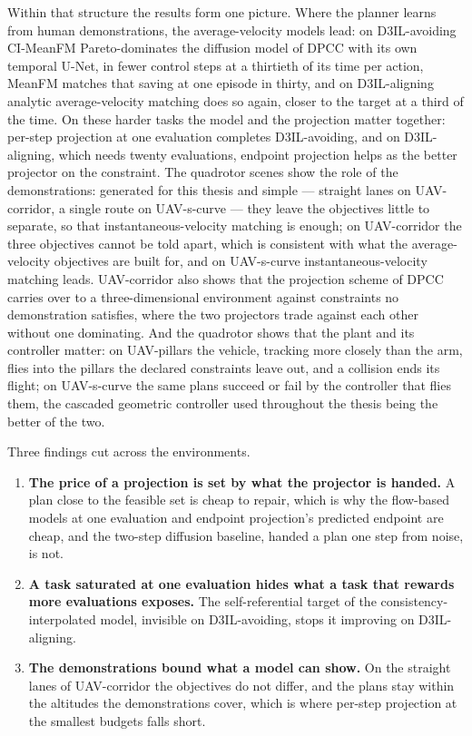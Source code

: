 Within that structure the results form one picture. Where the planner learns from human
demonstrations, the average-velocity models lead: on D3IL-avoiding CI-MeanFM Pareto-dominates the diffusion model of
\ac{DPCC} with its own temporal U-Net, in fewer control steps at a thirtieth of its time per action, MeanFM
matches that saving at one episode in thirty, and on
D3IL-aligning analytic average-velocity matching does so again, closer to the target at a third of the time.
On these harder tasks the model and the projection matter together: per-step projection at one evaluation
completes D3IL-avoiding, and on D3IL-aligning, which needs twenty evaluations, endpoint projection helps as the
better projector on the constraint. The quadrotor scenes show the role of the demonstrations: generated for
this thesis and simple --- straight lanes on UAV-corridor, a single route on UAV-s-curve --- they leave the
objectives little to separate, so that instantaneous-velocity matching is enough; on UAV-corridor the three
objectives cannot be told apart, which is consistent with what the average-velocity objectives are built for,
and on
UAV-s-curve instantaneous-velocity matching leads. UAV-corridor also shows that the projection scheme of
\ac{DPCC} carries over to a three-dimensional environment against constraints no demonstration satisfies,
where the two projectors trade against each other without one dominating. And the quadrotor shows that the
plant and its controller matter: on UAV-pillars the vehicle, tracking more closely than the arm, flies into
the pillars the declared constraints leave out, and a collision ends its flight; on UAV-s-curve the same
plans succeed or fail by the controller that flies them, the cascaded geometric controller used throughout the
thesis being the better of the two.

Three findings cut across the environments.

\begin{enumerate}
  \item \textbf{The price of a projection is set by what the projector is handed.} A plan close to the
    feasible set is cheap to repair, which is why the flow-based models at one evaluation and endpoint
    projection's predicted endpoint are cheap, and the two-step diffusion baseline, handed a plan one step
    from noise, is not.
  \item \textbf{A task saturated at one evaluation hides what a task that rewards more evaluations exposes.}
    The self-referential target of the consistency-interpolated model, invisible on D3IL-avoiding, stops it
    improving on D3IL-aligning.
  \item \textbf{The demonstrations bound what a model can show.} On the straight lanes of UAV-corridor the
    objectives do not differ, and the plans stay within the altitudes the demonstrations cover, which is
    where per-step projection at the smallest budgets falls short.
\end{enumerate}

